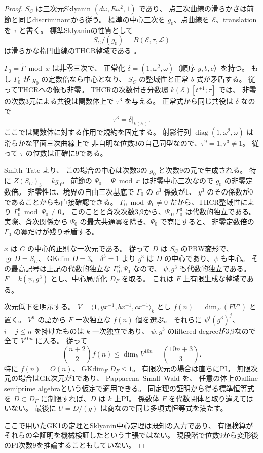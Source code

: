 \begin{proof}
$S_C$ は三次元Sklyanin $(d\omega,E\omega^2,1)$ であり、
点三次曲線の滑らかさは前節と同じdiscriminantから従う。
標準の中心三次を $g_0$、点曲線を $\mathcal E$、translationを $\tau$ と書く。
標準Sklyaninの性質として
\[
 S_C/(g_0)=B(\mathcal E,\tau,\mathcal L)
\]
は滑らかな楕円曲線のTHCR整域である
\cite[Introduction, \S3]{SmithTateCenters}。

$\Gamma_0=\widetilde\Gamma\bmod x$ は非零三次で、
正常化 $\delta=(1,\omega^2,\omega)$（順序 $y,b,c$）を持つ。
もし $\Gamma_0$ が $g_0$ の定数倍なら中心となり、
$S_C$ の整域性と正常 $b$ 式が矛盾する。
従ってTHCRへの像も非零。
THCRの次数付き分数環 $k(\mathcal E)[t^{\pm1};\tau]$ では、
非零の次数3元による共役は関数体上で $\tau^3$ を与える。
正常式から同じ共役は $\delta$ なので
\[
 \tau^3=\delta|_{k(\mathcal E)}.
\]
ここでは関数体に対する作用で規約を固定する。
射影行列 $\operatorname{diag}(1,\omega^2,\omega)$ は滑らかな平面三次曲線上で
非自明な位数3の自己同型なので、$\tau^9=1,\tau^3\ne1$。
従って $\tau$ の位数は正確に9である。

Smith--Tate \cite[Theorem~3.7, $r=1$]{SmithTateCenters}より、
この場合の中心は次数3の $g_0$ と次数9の元で生成される。
特に $Z(S_C)_3=kg_0$。
前節の $\Psi_0=\Psi\bmod x$ は非零中心三次なので $g_0$ の非零定数倍。
非零性は、境界の自由三次基底で $\Gamma_0$ の $c^3$ 係数が1、
$y^3$ のその係数が0であることからも直接確認できる。
$\Gamma_0\bmod\Psi_0\ne0$ だから、THCR整域性により
$\Gamma_0^3\bmod\Psi_0\ne0$。
このことと斉次次数3,9から、$\Psi_0,\Gamma_0^3$ は代数的独立である。
実際、斉次関係から $\Psi_0$ の最大共通冪を除き、$\Psi_0$ で商にすると、
非零定数倍の $\Gamma_0$ の冪だけが残り矛盾する。

$x$ は $C$ の中心的正則な一次元である。
従って $D$ は $S_C$ のPBW変形で、$\operatorname{gr}D=S_C$、$\operatorname{GKdim} D=3$。
$\delta^3=1$ より $g^3$ は $D$ の中心であり、$\psi$ も中心。
その最高記号は上記の代数的独立な $\Gamma_0^3,\Psi_0$ なので、
$\psi,g^3$ も代数的独立である。
$F=k(\psi,g^3)$ とし、中心局所化 $D_F$ を取る。
これは $F$ 上有限生成な整域である。

次元低下を明示する。
$V=\langle1,yx^{-1},bx^{-1},cx^{-1}\rangle_k$ とし
$f(n)=\dim_F(FV^n)$ と置く。
$V^n$ の語から $F$ 一次独立な $f(n)$ 個を選ぶ。
それらに $\psi^i(g^3)^j$、$i+j\le n$ を掛けたものは $k$ 一次独立であり、
$\psi,g^3$ のfiltered degreeが3,9なので全て $V^{10n}$ に入る。
従って
\[
 \binom{n+2}{2}f(n)\le\dim_k V^{10n}
 =\binom{10n+3}{3}.
\]
特に $f(n)=O(n)$、$\operatorname{GKdim}_F D_F\le1$。
有限次元の場合は直ちにPI。
無限次元の場合はGK次元が1であり、
Pappacena--Small--Wald \cite[Theorem~5]{PSSGKone}を、
任意の体上のaffine semiprime algebraという仮定で適用できる。
同定理の証明から得る標準恒等式を $D\subset D_F$ に制限すれば、$D$ は $k$ 上PI。
係数体 $F$ を代数閉体と取り違えてはいない。
最後に $U=D/(g)$ は商なので同じ多項式恒等式を満たす。

ここで用いたGK1の定理とSklyanin中心定理は既知の入力であり、
有限検算がそれらの全証明を機械検証したという主張ではない。
現段階で位数9から変形後のPI次数9を推論することもしていない。
\end{proof}
